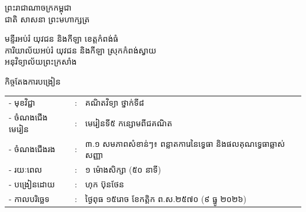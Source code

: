 \documentclass[a4paper,10pt]{article}
\newcommand{\khmflourish}{{\Tacteing\fontsize{36pt}{14pt}\selectfont\raisebox{-5pt}{3}}}
\begin{document}
\fontsize{10pt}{15.2pt}\selectfont

\begin{center}
  {\muol\fontsize{11pt}{16pt}\selectfont ព្រះរាជាណាចក្រកម្ពុជា}\\[2pt]
  {\muol\fontsize{10pt}{15pt}\selectfont ជាតិ សាសនា ព្រះមហាក្សត្រ}\\[1pt]
  \khmflourish
\end{center}

\vspace{-28pt}
{\muol\fontsize{9.5pt}{12.5pt}\selectfont
មន្ទីរអប់រំ យុវជន និងកីឡា ខេត្តកំពង់ធំ\\
ការិយាល័យអប់រំ យុវជន និងកីឡា ស្រុកកំពង់ស្វាយ\\
អនុវិទ្យាល័យព្រះក្រសាំង}

\vspace{1pt}
\begin{center}
  {\muol\fontsize{10pt}{14pt}\selectfont កិច្ចតែងការបង្រៀន}
\end{center}
\vspace{0pt}

{\renewcommand{\arraystretch}{0.95}
\hspace*{4.05cm}%
\begin{tabular}{@{}l l l@{}}
  - \hspace{0.35cm} មុខវិជ្ជា & : & គណិតវិទ្យា ថ្នាក់ទី៨ \\
  - \hspace{0.35cm} ចំណងជើងមេរៀន & : & មេរៀនទី៥ កន្សោមពីជគណិត \\
  - \hspace{0.35cm} ចំណងជើងរង & : & ៣.១ សមភាពសំខាន់ៗ៖ ពន្លាតការេនៃទ្វេធា និងផលគុណទ្វេធាឆ្លាស់សញ្ញា \\
  - \hspace{0.35cm} រយៈពេល & : & ១ ម៉ោងសិក្សា (៥០ នាទី) \\
  - \hspace{0.35cm} បង្រៀនដោយ & : & ហុក ប៊ុនថែន \\
  - \hspace{0.35cm} កាលបរិច្ឆេទ & : & ថ្ងៃពុធ ១៥រោច ខែកត្តិក ព.ស.២៥៧០ (៩ ធ្នូ ២០២៦) \\
\end{tabular}
}

\vspace{1pt}
\end{document}
